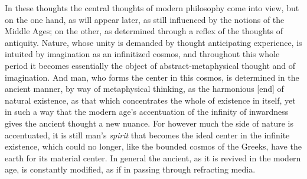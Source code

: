 In these thoughts the central thoughts of modern philosophy come into
view, but on the one hand, as will appear later, as still influenced
by the notions of the Middle Ages; on the other, as determined through
a reflex of the thoughts of antiquity. Nature, whose unity is demanded
by thought anticipating experience, is intuited by imagination as an
infinitized cosmos, and throughout this whole period it becomes
essentially the object of abstract-metaphysical thought and of
imagination. And man, who forms the center in this cosmos, is
determined in the ancient manner, by way of metaphysical thinking, as
the harmonious  [end] of natural existence, as that which
concentrates the whole of existence in itself, yet in such a way that
the modern age's accentuation of the infinity of inwardness gives the
ancient thought a new nuance. For however much the side of nature is
accentuated, it is still man's \emph{spirit} that becomes the ideal
center in the infinite existence, which could no longer, like the
bounded cosmos of the Greeks, have the earth for its material center.
In general the ancient, as it is revived in the
modern age, is constantly modified, as if in passing through
refracting media.


